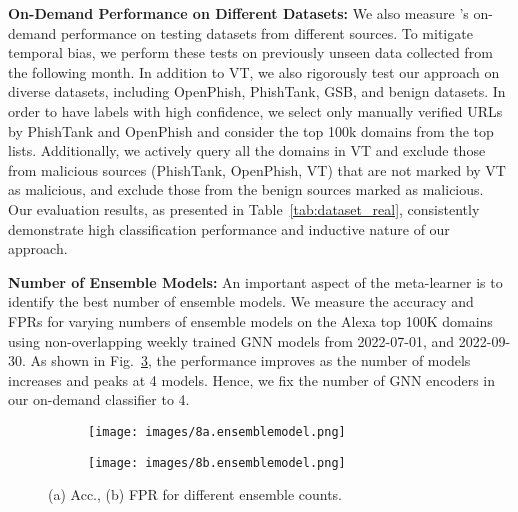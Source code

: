 {\bf On-Demand Performance on Different Datasets:} We also measure \system's on-demand performance on testing datasets from different sources. 
To mitigate temporal bias, we perform these tests on previously unseen data collected from the following month.
In addition to VT, we also rigorously test our approach on diverse datasets, including OpenPhish, PhishTank, GSB, and benign datasets. 
In order to have labels with high confidence, we select only manually verified URLs by PhishTank and OpenPhish and consider the top 100k domains from the top lists. 
 Additionally, we actively query all the domains in VT and exclude those from malicious sources (PhishTank, OpenPhish, VT) that are not marked by VT as malicious, and exclude those from the benign sources marked as malicious. Our evaluation results, as presented in Table~\ref{tab:dataset_real}, consistently demonstrate high classification performance and inductive nature of our approach. 

{\bf Number of Ensemble Models:} An important aspect of the meta-learner is to identify the best number of ensemble models. We measure the accuracy and FPRs for varying numbers of ensemble models on the Alexa top 100K domains using non-overlapping weekly trained GNN models from  2022-07-01, and 2022-09-30. 
As shown in Fig.~\ref{fig:exp_ensemblecount}, the performance improves as the number of models increases and peaks at 4 models. Hence, we fix the number of GNN encoders in our on-demand classifier to 4. 
\begin{figure}
\centering
\begin{subfigure}[t]{0.49\linewidth}
    \texttt{[image: images/8a.ensemblemodel.png]}
    \caption{}
    \label{fig:exp_ensemblecountacc}
  \end{subfigure}
  \begin{subfigure}[t]{0.49\linewidth}
    \texttt{[image: images/8b.ensemblemodel.png]}
    \caption{}
    \label{fig:exp_ensemblecountfpr}
  \end{subfigure}\hfill
  \caption{(a) Acc., (b) FPR for different ensemble counts.}
    \label{fig:exp_ensemblecount}
\end{figure}






